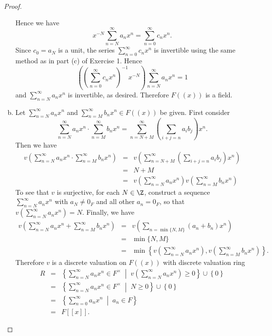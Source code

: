 \documentclass[10pt]{amsart}
\begin{document}
\begin{thm}
\begin{proof}
\begin{enumerate}[(a)]
      Hence we have $$x^{-N} \sum_{n=N}^\infty a_nx^n = \sum_{n=0}^\infty c_nx^n.$$
      Since $c_0 = a_N$ is a unit, the series $\sum_{n=0}^\infty c_nx^n$ is invertible using the same method as in part (c) of Exercise 1.
      Hence
      $$\left(\left(\sum_{n=0}^\infty c_nx^n\right)^{-1}x^{-N}\right) \sum_{n=N}^\infty a_nx^n = 1$$
      and $\sum_{n=N}^\infty a_nx^n$ is invertible, as desired.
      Therefore $F((x))$ is a field.
    \item
      Let $\sum_{n=N}^\infty a_nx^n$ and $\sum_{n=M}^\infty b_nx^n \in F((x))$ be given.
      First consider $$\sum_{n=N}^\infty a_nx^n \cdot \sum_{n=M}^\infty b_nx^n = \sum_{n=N+M}^\infty \left(\sum_{i + j = n} a_ib_j\right)x^n.$$
      Then we have
      \begin{eqnarray*}
        v\left(\sum_{n=N}^\infty a_nx^n \cdot \sum_{n=M}^\infty b_nx^n\right) &=& v\left(\sum_{n=N+M}^\infty \left(\sum_{i + j = n} a_ib_j\right)x^n\right)\\
        &=& N + M\\
        &=& v\left(\sum_{n=N}^\infty a_nx^n\right)v\left(\sum_{n=M}^\infty b_nx^n\right)
      \end{eqnarray*}
      To see that $v$ is surjective, for each $N \in \Z$, construct a sequence $\sum_{n=N}^\infty a_nx^n$ with $a_N \neq 0_F$ and all other $a_n = 0_F$, so that $v(\sum_{n=N}^\infty a_nx^n) = N$.
      Finally, we have 
      \begin{eqnarray*}
        v\left(\sum_{n=N}^\infty a_nx^n + \sum_{n=M}^\infty b_nx^n\right) &=& v\left(\sum_{n=\min\{N,M\}}(a_n + b_n)x^n\right)\\
        &=& \min\{N,M\}\\
        &=& \min\left\{v\left(\sum_{n=N}^\infty a_nx^n\right), v\left(\sum_{n=M}^\infty b_nx^n \right)\right\}.
      \end{eqnarray*}
      Therefore $v$ is a discrete valuation on $F((x))$ with discrete valuation ring
      \begin{eqnarray*}
        R &=& \left\{\sum_{n=N}^\infty a_nx^n \in F^\times \;\middle\vert\; v\left(\sum_{n=N}^\infty a_nx^n\right) \geq 0 \right\} \cup \left\{0\right\}\\
        &=& \left\{\sum_{n=N}^\infty a_nx^n \in F^\times \;\middle\vert\; N \geq 0\right\} \cup \left\{0\right\}\\
        &=& \left\{\sum_{n=0}^\infty a_nx^n \;\middle\vert\; a_n \in F \right\}\\
        &=& F[[x]].
      \end{eqnarray*}
      
    \end{enumerate}
  \end{proof}
\end{thm}
\end{document}
